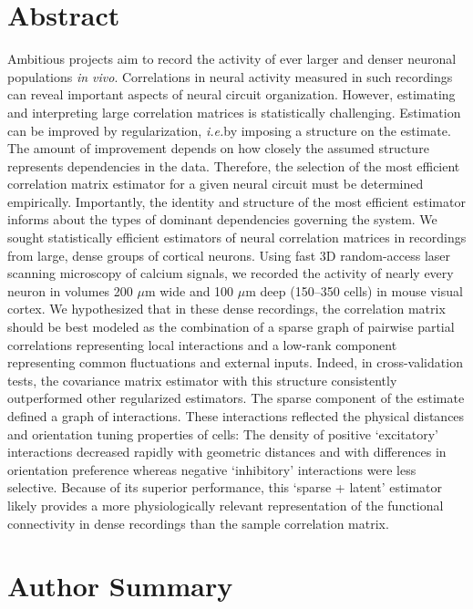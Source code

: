 \documentclass[10pt]{article}
\newcommand{\sq}[1]{\lq#1\rq}
\newcommand{\ie}{\emph{i.e.}\;}
\begin{document}
\section*{Abstract}
Ambitious projects aim to record the activity of ever larger and denser neuronal populations \emph{in vivo}.  Correlations in neural activity measured in such recordings can reveal important aspects of  neural circuit organization.  However, estimating and interpreting large correlation matrices is statistically challenging.  Estimation can be improved by regularization, \ie by imposing a structure on the estimate.  The amount of improvement depends on how closely the assumed structure represents dependencies in the data. Therefore, the selection of the most efficient correlation matrix estimator for a given neural circuit must be determined empirically.  Importantly, the identity and structure of the most efficient estimator informs about the types of dominant dependencies governing the system.
We sought statistically efficient estimators of neural correlation matrices in recordings from large, dense groups of cortical neurons.  Using fast 3D random-access laser scanning microscopy of calcium signals, we recorded the activity of nearly every neuron in volumes 200 $\mu$m wide and 100 $\mu$m deep (150--350 cells) in mouse visual cortex.  We hypothesized that in these dense recordings, the correlation matrix should be best modeled as the combination of a sparse graph of pairwise partial correlations representing local interactions and a low-rank component representing common fluctuations and external inputs.  Indeed, in cross-validation tests, the covariance matrix estimator with this structure consistently outperformed other regularized estimators. The sparse component of the estimate defined a graph of interactions. These interactions reflected the physical distances and orientation tuning properties of cells: The density of positive \sq{excitatory} interactions decreased rapidly with geometric distances and with differences in orientation preference whereas negative \sq{inhibitory} interactions were less selective.  Because of its superior performance, this \sq{sparse + latent} estimator likely provides a more physiologically relevant representation of the functional connectivity in dense recordings than the sample correlation matrix.

\section*{Author Summary}
\end{document}
